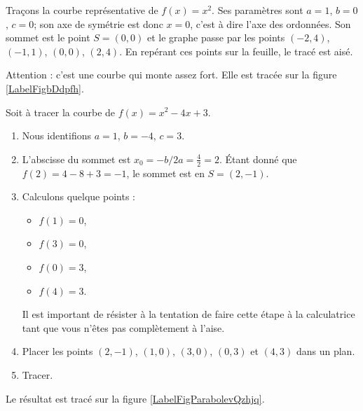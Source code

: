 \begin{example}
    Traçons la courbe représentative de \( f(x)=x^2\). Ses paramètres sont \( a=1\), \( b=0\), \( c=0\); son axe de symétrie est donc \( x=0\), c'est à dire l'axe des ordonnées. Son sommet est le point \( S=(0,0)\) et le graphe passe par les points \( (-2,4)\), \( (-1,1)\), \( (0,0)\), \( (2,4)\). En repérant ces points sur la feuille, le tracé est aisé.

    Attention : c'est une courbe qui monte assez fort. Elle est tracée sur la figure \ref{LabelFigbDdpfh}.
\newcommand{\CaptionFigbDdpfh}{La courbe \( x\mapsto x^2\).}


\end{example}

\begin{example}
    Soit à tracer la courbe de \( f(x)=x^2-4x+3\).
    \begin{enumerate}
        \item
            Nous identifions \( a=1\), \( b=-4\), \( c=3\). 
        \item
            L'abscisse du sommet est \( x_0=-b/2a=\frac{ 4 }{2}=2\). Étant donné que \( f(2)=4-8+3=-1\), le sommet est en \( S=(2,-1)\).
        \item
            Calculons quelque points :
            \begin{itemize}
                \item \( f(1)=0\),
                \item
                    \( f(3)=0\),
                \item
                    \( f(0)=3\),
                \item
                    \( f(4)=3\).
            \end{itemize}
            Il est important de résister à la tentation de faire cette étape à la calculatrice tant que vous n'êtes pas complètement à l'aise.
        \item
            Placer les points \( (2,-1)\), \( (1,0)\), \( (3,0)\), \( (0,3)\) et \( (4,3)\) dans un plan.
        \item
            Tracer.
    \end{enumerate}
    Le résultat est tracé sur la figure \ref{LabelFigParabolevQzhjq}.
\newcommand{\CaptionFigParabolevQzhjq}{La courbe de la parabole \( x^2-4x+3\).}

\end{example}

